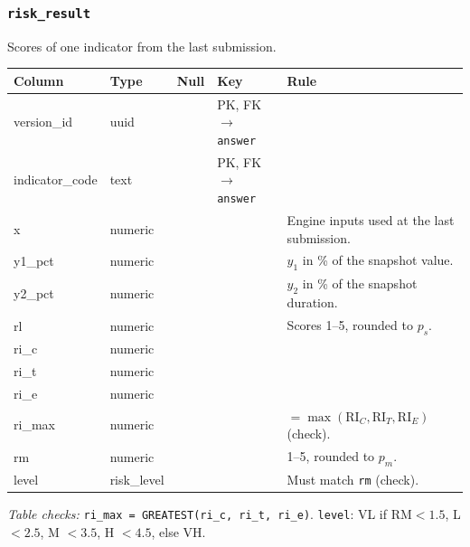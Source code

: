 \documentclass[11pt,a4paper]{article}
\newcommand{\RIC}{\mathrm{RI}_{C}}
\newcommand{\RIT}{\mathrm{RI}_{T}}
\newcommand{\RIE}{\mathrm{RI}_{E}}
\newcommand{\RM}{\mathrm{RM}}
\begin{document}
\subsubsection*{\texttt{risk\_result}}
\noindent Scores of one indicator from the last submission.\par\vspace{2pt}
{\footnotesize\setlength{\tabcolsep}{4pt}\noindent\begin{tabularx}{\linewidth}{@{}>{\ttfamily\raggedright\arraybackslash}p{3.2cm} >{\ttfamily\raggedright\arraybackslash}p{3.15cm} >{\centering\arraybackslash}p{0.6cm} >{\raggedright\arraybackslash}p{3.85cm} Y@{}}
\toprule{}\normalfont Column & \normalfont Type & Null & Key & Rule \\ \midrule
version\_id & uuid &  & PK, FK$\to$\texttt{answer} &  \\
indicator\_code & text &  & PK, FK$\to$\texttt{answer} &  \\
x & numeric &  &  & Engine inputs used at the last submission. \\
y1\_pct & numeric &  &  & $y_1$ in \% of the snapshot value. \\
y2\_pct & numeric &  &  & $y_2$ in \% of the snapshot duration. \\
rl & numeric &  &  & Scores 1--5, rounded to $p_s$. \\
ri\_c & numeric &  &  &  \\
ri\_t & numeric &  &  &  \\
ri\_e & numeric &  &  &  \\
ri\_max & numeric &  &  & $= \max(\RIC,\RIT,\RIE)$ (check). \\
rm & numeric &  &  & 1--5, rounded to $p_m$. \\
level & risk\_level &  &  & Must match \texttt{rm} (check). \\
\bottomrule\end{tabularx}}
{\footnotesize\noindent\textit{Table checks:} \texttt{ri\_max = GREATEST(ri\_c, ri\_t, ri\_e)}. \texttt{level}: VL if $\RM<1.5$, L $<2.5$, M $<3.5$, H $<4.5$, else VH.\par}

\end{document}
